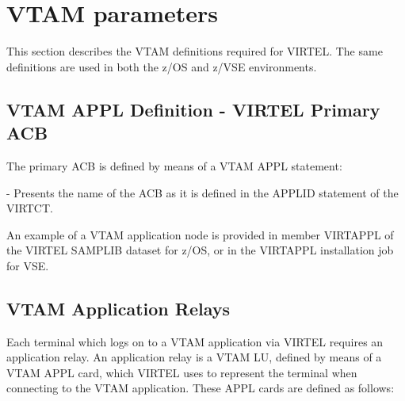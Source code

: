 \documentclass[letterpaper,10pt,english]{sphinxmanual}
\begin{document}
\section{VTAM parameters}
\label{\detokenize{Installation_Guide:vtam-parameters}}
This section describes the VTAM definitions required for VIRTEL. The same definitions are used in both the z/OS and z/VSE environments.

\ignorespaces 

\subsection{VTAM APPL Definition - VIRTEL Primary ACB}
\label{\detokenize{Installation_Guide:vtam-appl-definition-virtel-primary-acb}}\label{\detokenize{Installation_Guide:index-21}}
The primary ACB is defined by means of a VTAM APPL statement:

\begin{sphinxVerbatim}[commandchars=\\\{\}]
  
\end{sphinxVerbatim}

 - Presents the name of the ACB as it is defined in the APPLID statement of the VIRTCT.

An example of a VTAM application node is provided in member VIRTAPPL of the VIRTEL SAMPLIB dataset for z/OS, or in the VIRTAPPL installation job for VSE.

\ignorespaces 

\subsection{VTAM Application Relays}
\label{\detokenize{Installation_Guide:vtam-application-relays}}\label{\detokenize{Installation_Guide:index-22}}
Each terminal which logs on to a VTAM application via VIRTEL requires an application relay. An application relay is a VTAM LU, defined by means of a VTAM APPL card, which VIRTEL uses to represent the terminal when connecting to the VTAM application. These APPL cards are defined as follows:
\end{document}
